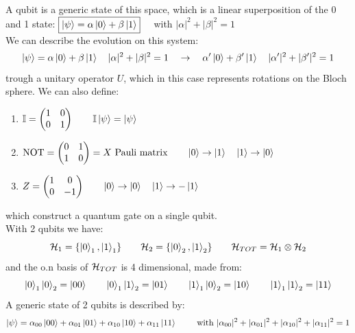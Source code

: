 A qubit is a generic state of this space, which is a linear superposition of the 0 and 1 state: $\boxed{\left|\psi\right\rangle = \alpha \left|0\right\rangle + \beta\left|1\right\rangle} \quad $ with $|\alpha|^2 + |\beta|^2 = 1$\\

We can describe the evolution on this system:
$$ \left|\psi\right\rangle = \alpha \left|0\right\rangle + \beta \left|1\right\rangle \quad |\alpha|^2 + |\beta|^2 = 1 \quad \to\quad  \alpha' \left|0\right\rangle + \beta ' \left|1\right\rangle \quad |\alpha'|^2 + |\beta'|^2 = 1$$
trough a unitary operator $U$, which in this case represents rotations on the Bloch sphere. We can also define:
\begin{enumerate}
    \item $\mathbb{I} = \begin{pmatrix} 1&0\\0&1  \end{pmatrix} \qquad \mathbb{I}\left|\psi\right\rangle = \left|\psi\right\rangle$
    \item $\text{NOT} = \begin{pmatrix}
        0&1\\1&0    \end{pmatrix} = X \text{ Pauli matrix}  \qquad \left|0\right\rangle \to \left|1\right\rangle\quad \left|1\right\rangle \to \left|0\right\rangle$
    \item $Z = \begin{pmatrix}
        1&0\\0&-1    \end{pmatrix} \qquad \left|0\right\rangle\to \left|0\right\rangle\quad \left|1\right\rangle \to -\left|1\right\rangle$
\end{enumerate}
which construct a quantum gate on a single qubit.\\

With 2 qubits we have:
$$\mathcal{H}_1 = \{\left|0\right\rangle_1, \left|1\right\rangle_1\} \qquad \mathcal{H}_2 = \{\left|0\right\rangle_2, \left|1\right\rangle_2\} \qquad \mathcal{H}_{TOT} = \mathcal{H}_1 \otimes \mathcal{H}_2$$
and the o.n basis of $\mathcal{H}_{TOT}$ is 4 dimensional, made from:
$$\left|0\right\rangle_1 \left|0\right\rangle_2 = \left|00\right\rangle \qquad \left|0\right\rangle_1 \left|1\right\rangle_2 = \left|01\right\rangle \qquad \left|1\right\rangle_1 \left|0\right\rangle_2 = \left|10\right\rangle \qquad \left|1\right\rangle_1 \left|1\right\rangle_2 = \left|11\right\rangle$$
A generic state of 2 qubits is described by:
$$\left|\psi\right\rangle = \alpha_{00} \left|00\right\rangle + \alpha_{01}\left|01\right\rangle + \alpha_{10}\left|10\right\rangle + \alpha_{11}\left|11\right\rangle \qquad \text{ with } |\alpha_{00}|^2 + |\alpha_{01}|^2 +|\alpha_{10}|^2 +|\alpha_{11}|^2 = 1$$

